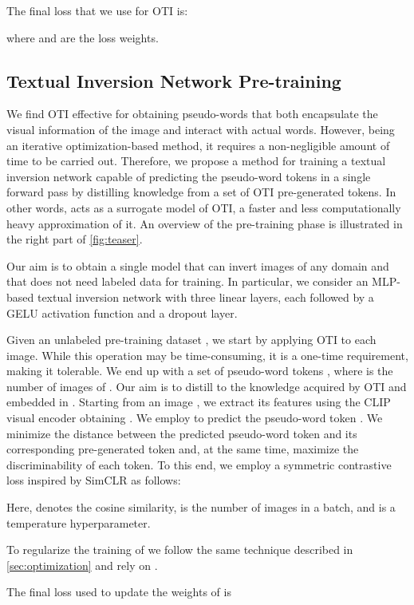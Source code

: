 \documentclass[10pt,twocolumn,letterpaper]{article}
\begin{document}
The final loss that we use for OTI is:

where  and  are the loss weights.

\subsection{Textual Inversion Network  Pre-training}\label{sec:distillation}
We find OTI effective for obtaining pseudo-words that both encapsulate the visual information of the image and interact with actual words. However, being an iterative optimization-based method, it requires a non-negligible amount of time to be carried out. Therefore, we propose a method for training a textual inversion network  capable of predicting the pseudo-word tokens in a single forward pass by distilling knowledge from a set of OTI pre-generated tokens. In other words,  acts as a surrogate model of OTI, \ie a faster and less computationally heavy approximation of it. An overview of the pre-training phase is illustrated in the right part of \cref{fig:teaser}.

Our aim is to obtain a single model that can invert images of any domain and that does not need labeled data for training. In particular, we consider an MLP-based textual inversion network  with three linear layers, each followed by a GELU \cite{hendrycks2016gaussian} activation function and a dropout layer. 

Given an unlabeled pre-training dataset , we start by applying OTI to each image. While this operation may be time-consuming, it is a one-time requirement, making it tolerable. We end up with a set of pseudo-word tokens , where  is the number of images of . Our aim is to distill to  the knowledge acquired by OTI and embedded in . Starting from an image , we extract its features using the CLIP visual encoder obtaining . We employ  to predict the pseudo-word token .  We minimize the distance between the predicted pseudo-word token  and its corresponding pre-generated token  and, at the same time, maximize the discriminability of each token.
To this end, we employ a symmetric contrastive loss inspired by SimCLR \cite{chen2020simple, cohen2022this} as follows:


Here,  denotes the cosine similarity,  is the number of images in a batch, and  is a temperature hyperparameter.

To regularize the training of  we follow the same technique described in \cref{sec:optimization} and rely on .

The final loss used to update the weights of  is
\end{document}
